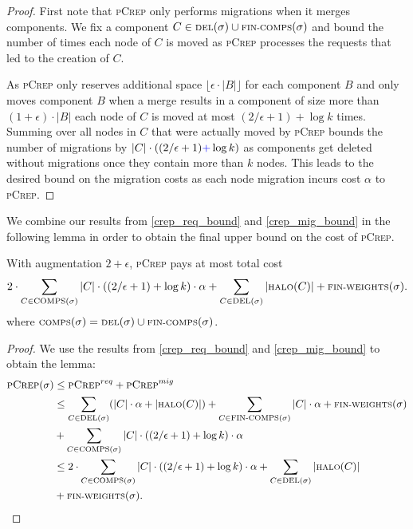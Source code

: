 \documentclass[a4paper,UKenglish,cleveref, autoref, thm-restate,authorcolumns]{../lipics/lipics-v2019}
\newcommand{\nl}{\newline}
\newcommand{\adjDel}{\textsc{pCrep}}
\newcommand{\del}{\text{\scriptsize DEL}}
\newcommand{\halo}{\text{\scriptsize HALO}}
\newcommand{\finalComps}{\text{\scriptsize FIN-COMPS}}
\newcommand{\finalWeights}{\text{\scriptsize FIN-WEIGHTS}}
\newcommand{\comps}{\text{\scriptsize COMPS}}
\newcommand{\new}[1]{{\textcolor{blue}{#1}}}
\begin{document}
\begin{proof}
	First note that \adjDel{} only performs migrations when it merges components.
	We fix a component $C\in\del{}(\sigma)\cup \finalComps(\sigma)$ and bound the number of times each node of $C$ is moved as \adjDel{} processes the requests that led to the creation of $C$. 
	
	As \adjDel{} only reserves additional space $\lfloor\epsilon\cdot|B|\rfloor$ for each component $B$ and only moves component $B$ when a merge results in a component of size more than $(1+\epsilon)\cdot|B|$ each node of $C$ is moved at most
	$(2/\epsilon+1)+\log k$ times. Summing over all nodes in $C$ that were actually moved by \adjDel{} bounds the number of migrations by $|C|\cdot((2/\epsilon+1)\new{+} \log k)$ as components get deleted without migrations once they contain more than $k$ nodes. This leads to the desired bound on the migration costs as each node migration incurs cost $\alpha$ to \adjDel{}.
\end{proof}


We combine our results from \cref{crep_req_bound} and \cref{crep_mig_bound} in the following lemma in order to obtain the final upper bound on the cost of \adjDel{}.

\begin{lemma}
	\label{crep_upper_bound}
	With augmentation $2+\epsilon$, \adjDel{} pays at most total cost\nl
	\begin{align*}
	2\cdot\sum_{C\in\comps(\sigma)}|C|\cdot((2/\epsilon+1)+\log k)\cdot\alpha+\sum_{C\in\del{}(\sigma)}|\halo(C)|+\finalWeights(\sigma).
	\end{align*}
	where $\comps(\sigma)=\del{}(\sigma)\cup\finalComps(\sigma)$.
\end{lemma}

\begin{proof}
	We use the results from \cref{crep_req_bound} and \cref{crep_mig_bound} to obtain the lemma:
	\begin{align*}
	\adjDel(\sigma) & \leq \adjDel^{req} + \adjDel^{mig}\\
	& \leq \sum_{C\in\del{}(\sigma)}(|C|\cdot\alpha+|\halo(C)|)+\sum_{C\in \finalComps(\sigma)}|C|\cdot\alpha+\finalWeights(\sigma)\\ &+\sum_{C\in\comps(\sigma)}|C|\cdot((2/\epsilon+1)+\log k)\cdot\alpha\\
	&\leq 2\cdot\sum_{C\in\comps(\sigma)}|C|\cdot((2/\epsilon+1)+\log k)\cdot\alpha+\sum_{C\in\del{}(\sigma)}|\halo(C)|\\
	&+\finalWeights(\sigma).
	\end{align*}
\end{proof}
\end{document}
